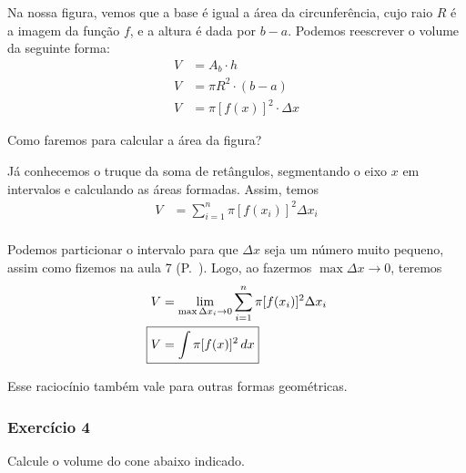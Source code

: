 \documentclass[12pt,openright,twoside,a4paper]{article}
\theoremstyle{definition}
\begin{document}
	
	
	Na nossa figura, vemos que a base é igual a área da circunferência, cujo raio $R$ é a imagem da função $f$, e a altura é dada por $b-a$. Podemos reescrever o volume da seguinte forma:
	\begin{align*}
		V &= A_b \cdot h\\
		V &= \pi R^2 \cdot (b-a)\\
		V &= \pi [f(x)]^2 \cdot \Delta x
	\end{align*}
	
	Como faremos para calcular a área da figura? 
	
	Já conhecemos o truque da soma de retângulos, segmentando o eixo $x$ em intervalos e calculando as áreas formadas. Assim, temos
	\begin{align*}
		V &= \sum_{i=1}^{n} \pi [f(x_i)]^2 \Delta x_i\\
	\end{align*}
	
	Podemos particionar o intervalo para que $\Delta x$ seja um número muito pequeno, assim como fizemos na aula 7 (P.~\pageref{subsec:integrais}). Logo, ao fazermos $\max \Delta x \to 0$, teremos
	\begin{align*}
		V &= \lim_{\max{\Delta x_i} \to 0} \sum_{i=1}^{n} \pi [f(x_i)]^2 \Delta x_i\\
		\Aboxed{V &= \int \pi [f(x)]^2 \, dx}
	\end{align*}
	
	Esse raciocínio também vale para outras formas geométricas.
	
	\subsubsection{Exercício 4}
	
		Calcule o volume do cone abaixo indicado.
		
\end{document}
